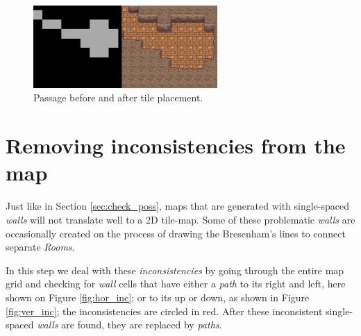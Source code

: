 \begin{figure}[h]
    \caption{Passage before and after tile placement.}
    \centerline{\includegraphics[width=7cm]{images/development/it_works.png}}
    \label{fig:it_works}
\end{figure}

\section{Removing inconsistencies from the map}

Just like in Section \ref{sec:check_poss}, maps that are generated with single-spaced \emph{walls} will not translate well to a 2D tile-map. Some of these problematic \emph{walls} are occasionally created on the process of drawing the Bresenham's lines to connect separate \emph{Rooms}.

In this step we deal with these \emph{inconsistencies} by going through the entire map grid and checking for \emph{wall} cells that have either a \emph{path} to its right and left, here shown on Figure \ref{fig:hor_inc}; or to its up or down, as shown in Figure \ref{fig:ver_inc}; the inconsistencies are circled in red. After these inconsistent single-spaced \emph{walls} are found, they are replaced by \emph{paths}.

